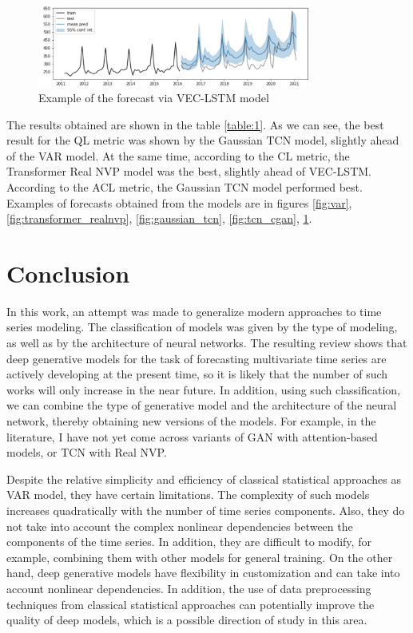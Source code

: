 \documentclass[12pt,a4paper]{article}
\begin{document}
\begin{figure}[!ht]
    \centering
    \includegraphics[width=0.8\textwidth]{figures/vec_lstm.png}
    \caption{Example of the forecast via VEC-LSTM model}
    \label{fig:vec_lstm}
\end{figure}

The results obtained are shown in the table \ref{table:1}. As we can see, the best result for the QL metric was shown by the Gaussian TCN model, slightly ahead of the VAR model. At the same time, according to the CL metric, the Transformer Real NVP model was the best, slightly ahead of VEC-LSTM. According to the ACL metric, the Gaussian TCN model performed best. Examples of forecasts obtained from the models are in figures \ref{fig:var}, \ref{fig:transformer_realnvp}, \ref{fig:gaussian_tcn}, \ref{fig:tcn_cgan}, \ref{fig:vec_lstm}.

\section{Conclusion}

In this work, an attempt was made to generalize modern approaches to time series modeling. The classification of models was given by the type of modeling, as well as by the architecture of neural networks. The resulting review shows that deep generative models for the task of forecasting multivariate time series are actively developing at the present time, so it is likely that the number of such works will only increase in the near future. In addition, using such classification, we can combine the type of generative model and the architecture of the neural network, thereby obtaining new versions of the models. For example, in the literature, I have not yet come across variants of GAN with attention-based models, or TCN with Real NVP.

Despite the relative simplicity and efficiency of classical statistical approaches as VAR model, they have certain limitations. The complexity of such models increases quadratically with the number of time series components. Also, they do not take into account the complex nonlinear dependencies between the components of the time series. In addition, they are difficult to modify, for example, combining them with other models for general training. On the other hand, deep generative models have flexibility in customization and can take into account nonlinear dependencies. In addition, the use of data preprocessing techniques from classical statistical approaches can potentially improve the quality of deep models, which is a possible direction of study in this area.


\end{document}

